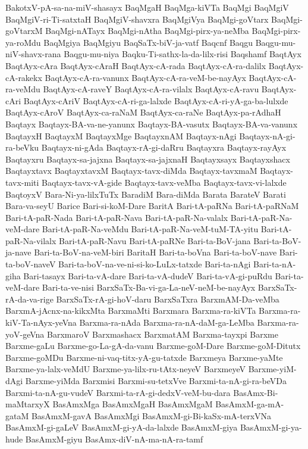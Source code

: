 {BakotxV-pA-sa-na-miV-shasayx
BaqMgaH
BaqMga-kiVTa
BaqMgi
BaqMgiV
BaqMgiV-ri-Ti-satxtaH
BaqMgiV-shavxra
BaqMgiVya
BaqMgi-goVtarx
BaqMgi-goVtarxM
BaqMgi-nATayx
BaqMgi-nAtha
BaqMgi-pirx-ya-neMba
BaqMgi-pirx-ya-roMdu
BaqMgiya
BaqMgiyu
BaqSaTx-biV-ja-vatf
Baqcnf
Baqgu
Baqgu-mu-niV-shavx-rana
Baqgu-mu-niya
Baqku-Ti-sathx-la-da-lilx-risi
Baqshamf
BaqtAyx
BaqtAyx-cAra
BaqtAyx-cAraH
BaqtAyx-cA-rada
BaqtAyx-cA-ra-dalilx
BaqtAyx-cA-rakekx
BaqtAyx-cA-ra-vanunx
BaqtAyx-cA-ra-veM-be-nayAyx
BaqtAyx-cA-ra-veMdu
BaqtAyx-cA-raveY
BaqtAyx-cA-ra-vilalx
BaqtAyx-cA-ravu
BaqtAyx-cAri
BaqtAyx-cAriV
BaqtAyx-cA-ri-ga-lalxde
BaqtAyx-cA-ri-yA-ga-ba-lulxde
BaqtAyx-cAroV
BaqtAyx-ca-raNaM
BaqtAyx-ca-raNe
BaqtAyx-pa-rAdhaH
Baqtayx
Baqtayx-BA-va-ne-yanunx
Baqtayx-BA-vasutx
Baqtayx-BA-va-vanunx
BaqtayxH
BaqtayxM
BaqtayxMge
BaqtayxnAM
Baqtayx-nAgi
Baqtayx-nA-gi-ra-beVku
Baqtayx-ni-gAda
Baqtayx-rA-gi-daRru
Baqtayxra
Baqtayx-rayAyx
Baqtayxru
Baqtayx-sa-jajxna
Baqtayx-sa-jajxnaH
Baqtayxsayx
Baqtayxshacx
Baqtayxtavx
BaqtayxtavxM
Baqtayx-tavx-diMda
Baqtayx-tavxmaM
Baqtayx-tavx-miti
Baqtayx-tavx-vA-gide
Baqtayx-tavx-veMba
Baqtayx-tavx-vi-lalxde
BaqtoyxV
Bara-Ni-ya-lilxTuTx
BaradiM
Bara-diMda
Barata
BarateV
Barati
Bara-va-seyU
Barice
Bari-si-koM-Dare
BaritA
Bari-tA-paRNa
Bari-tA-paRNaM
Bari-tA-paR-Nada
Bari-tA-paR-Nava
Bari-tA-paR-Na-valalx
Bari-tA-paR-Na-veM-dare
Bari-tA-paR-Na-veMdu
Bari-tA-paR-Na-veM-tuM-TA-yitu
Bari-tA-paR-Na-vilalx
Bari-tA-paR-Navu
Bari-tA-paRNe
Bari-ta-BoV-jana
Bari-ta-BoV-ja-nave
Bari-ta-BoV-na-veM-biri
BaritaH
Bari-ta-boVna
Bari-ta-boV-nave
Bari-ta-boV-naveV
Bari-ta-boV-na-ve-ni-si-ko-LuLx-tatxde
Bari-ta-nAgi
Bari-ta-nA-giha
Bari-tasayx
Bari-ta-vA-dare
Bari-ta-vA-dudeV
Bari-ta-vA-gi-puRdu
Bari-ta-veM-dare
Bari-ta-ve-nisi
BarxSaTx-Ba-vi-ga-La-neV-neM-be-nayAyx
BarxSaTx-rA-da-va-rige
BarxSaTx-rA-gi-hoV-daru
BarxSaTxra
BarxmAM-Da-veMba
BarxmA-jAcnx-na-kikxMta
BarxmaMti
Barxmara
Barxma-ra-kiVTa
Barxma-ra-kiV-Ta-nAyx-yeVna
Barxma-ra-nAda
Barxma-ra-nA-daM-ga-LeMba
Barxma-ra-yoV-geVna
BarxmaroV
Barxmashacx
BarxmatAM
Barxma-tayxpi
Barxme
Barxme-gaLu
Barxme-go-La-gA-da-vanu
Barxme-goM-Dare
Barxme-goM-Ditutx
Barxme-goMDu
Barxme-ni-vaq-titx-yA-gu-tatxde
Barxmeya
Barxme-yaMte
Barxme-ya-lalx-veMdU
Barxme-ya-lilx-ru-tAtx-neyeV
BarxmeyeV
Barxme-yiM-dAgi
Barxme-yiMda
Barxmisi
Barxmi-su-tetxVve
Barxmi-ta-nA-gi-ra-beVDa
Barxmi-ta-nA-gu-vudeV
Barxmi-ta-rA-gi-dedxV-veM-bu-dara
BasAmx-Bi-maMtarxyX
BasAmxMga
BasAmxMgaH
BasAmxMgaM
BasAmxM-ga-mA-gataM
BasAmxM-gavA
BasAmxMgi
BasAmxM-gi-Bi-kaSx-mA-terxVNa
BasAmxM-gi-gaLeV
BasAmxM-gi-yA-da-lalxde
BasAmxM-giya
BasAmxM-gi-ya-hude
BasAmxM-giyu
BasAmx-diV-nA-ma-nA-ra-tamf
}
